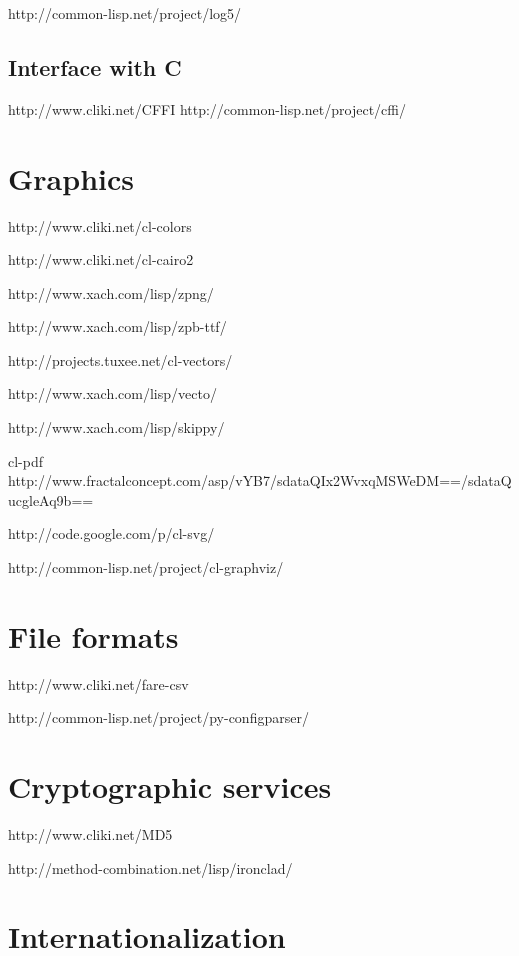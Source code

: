 \documentclass[10pt,english]{book}
\begin{document}
http://common-lisp.net/project/log5/

\section{Interface with C}
\label{sec:interface-with-c}

http://www.cliki.net/CFFI
http://common-lisp.net/project/cffi/



\chapter{Graphics}
\label{cha:graphics}

http://www.cliki.net/cl-colors

http://www.cliki.net/cl-cairo2

http://www.xach.com/lisp/zpng/

http://www.xach.com/lisp/zpb-ttf/

http://projects.tuxee.net/cl-vectors/

http://www.xach.com/lisp/vecto/

http://www.xach.com/lisp/skippy/

cl-pdf
http://www.fractalconcept.com/asp/vYB7/sdataQIx2WvxqMSWeDM==/sdataQucgleAq9b==

http://code.google.com/p/cl-svg/

http://common-lisp.net/project/cl-graphviz/


\chapter{File formats}
\label{cha:file-formats}

http://www.cliki.net/fare-csv

http://common-lisp.net/project/py-configparser/


\chapter{Cryptographic services}
\label{cha:crypt-serv}

http://www.cliki.net/MD5

http://method-combination.net/lisp/ironclad/



\chapter{Internationalization}
\label{cha:internationalization}
\end{document}

